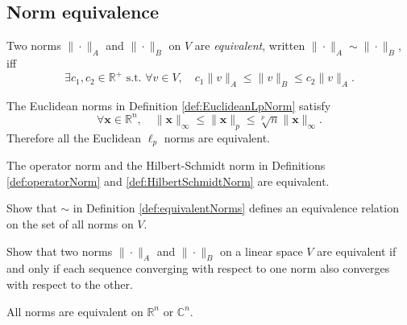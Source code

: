 \subsection{Norm equivalence}
\label{sec:norm-equivalence}

\begin{defn}
  \label{def:equivalentNorms}
  Two norms $\|\cdot\|_A$ and $\|\cdot\|_B$ on $V$ are
  \emph{equivalent}, written $\|\cdot\|_A\sim \|\cdot\|_B$, iff
  \begin{equation}
    \label{eq:equivalentNorms}
    \exists c_1, c_2\in \mathbb{R}^+ \text{ s.t. }
    \forall v\in V,\quad
    c_1\|v\|_A \le \|v\|_B \le c_2 \|v\|_A.
  \end{equation}
\end{defn}

\begin{exm}
  The Euclidean norms in Definition \ref{def:EuclideanLpNorm}
  satisfy
  \begin{equation}
    \label{eq:EuclideanNormsAreEquivalent}
    \forall \mathbf{x} \in \mathbb{R}^n,\quad
    \|\mathbf{x}\|_{\infty} \le \|\mathbf{x}\|_p
    \le \sqrt[p]{n} \|\mathbf{x}\|_{\infty}.
  \end{equation}
  Therefore all the Euclidean $\ell_p$ norms
  are equivalent.
\end{exm}

\begin{exm}
  The operator norm and the Hilbert-Schmidt norm
  in Definitions \ref{def:operatorNorm}
  and \ref{def:HilbertSchmidtNorm}
  are equivalent. 
\end{exm}

\begin{exc}
  \label{exc:equivalenceOfNorms}
  Show that $\sim$ in Definition \ref{def:equivalentNorms}
  defines an equivalence relation
  on the set of all norms on $V$.
\end{exc}

\begin{lem}
  \label{lem:normEquivCondViaConvergence}
  Show that two norms $\|\cdot\|_A$ and $\|\cdot\|_B$
  on a linear space $V$ are equivalent
  if and only if each sequence converging with respect to
  one norm %
  also converges with respect to the other. %
\end{lem}

\begin{thm}
  \label{thm:normEquivalenceRn}
  All norms are equivalent on $\mathbb{R}^n$ or $\mathbb{C}^n$.
\end{thm}


